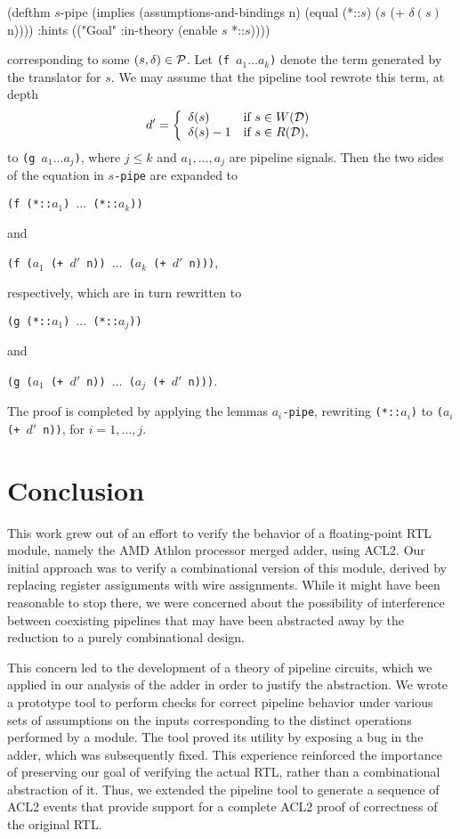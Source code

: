 \documentclass{article}
\begin{document}
\begin{acl2}
(defthm $s$-pipe
  (implies (assumptions-and-bindings n)
           (equal (*::$s$) ($s$ (+ $\delta(s)$ n))))
  :hints (("Goal" :in-theory (enable $s$ *::$s$))))
\end{acl2}\noindent
corresponding to some $(s,\delta) \in {\cal P}$.  Let
{\tt (f $a_1 \ldots a_k$)} denote the term generated by the translator for
$s$.  We may assume that the pipeline tool rewrote this term, at depth
\[d' = \left\{\begin{array}{ll}
         \delta(s) & \mbox{if $s \in W({\cal D})$}\\
         \delta(s)-1 & \mbox{if $s \in R({\cal D})$}, \end{array} \right. \]
to {\tt (g $a_1 \ldots a_j$)}, where $j \leq k$ and $a_1,\ldots,a_j$
are pipeline signals.  Then the two sides of the equation in
$s$\verb!-pipe! are expanded to
\begin{center}
{\tt (f (*::$a_1$) $\ldots$ (*::$a_k$))}
\end{center}
and
\begin{center}
{\tt (f ($a_1$ (+ $d'$ n)) $\ldots$ ($a_k$ (+ $d'$ n)))},
\end{center}
respectively, which are in turn rewritten to
\begin{center}
{\tt (g (*::$a_1$) $\ldots$ (*::$a_j$))}
\end{center}
and
\begin{center}
{\tt (g ($a_1$ (+ $d'$ n)) $\ldots$ ($a_j$ (+ $d'$ n)))}.
\end{center}
The proof is completed by applying the lemmas $a_i$\verb!-pipe!,
rewriting {\tt (*::$a_i$)} to {\tt ($a_i$ (+ $d'$ n))}, for $i =
1,\ldots,j$.


\section{Conclusion}

This work grew out of an effort to verify the behavior of a
floating-point RTL module, namely the AMD Athlon processor merged
adder, using ACL2.  Our initial approach was to verify a combinational
version of this module, derived by replacing register assignments with
wire assignments.  While it might have been reasonable to stop there,
we were concerned about the possibility of interference between
coexisting pipelines that may have been abstracted away by the
reduction to a purely combinational design.

This concern led to the development of a theory of pipeline circuits,
which we applied in our analysis of the adder in order to justify the
abstraction.  We wrote a prototype tool to perform checks for correct
pipeline behavior under various sets of assumptions on the inputs
corresponding to the distinct operations performed by a module.  The
tool proved its utility by exposing a bug in the adder, which was
subsequently fixed.  This experience reinforced the importance of
preserving our goal of verifying the actual RTL, rather than a
combinational abstraction of it.  Thus, we extended the pipeline tool
to generate a sequence of ACL2 events that provide support for a
complete ACL2 proof of correctness of the original RTL.
\end{document}
